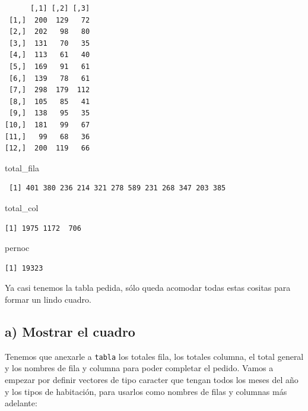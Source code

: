 \documentclass[
]{book}
\newenvironment{Shaded}{\begin{snugshade}}{\end{snugshade}}
\newcommand{\NormalTok}[1]{#1}
\begin{document}
\begin{verbatim}
      [,1] [,2] [,3]
 [1,]  200  129   72
 [2,]  202   98   80
 [3,]  131   70   35
 [4,]  113   61   40
 [5,]  169   91   61
 [6,]  139   78   61
 [7,]  298  179  112
 [8,]  105   85   41
 [9,]  138   95   35
[10,]  181   99   67
[11,]   99   68   36
[12,]  200  119   66
\end{verbatim}

\begin{Shaded}
\begin{Highlighting}[]
\NormalTok{total\_fila}
\end{Highlighting}
\end{Shaded}

\begin{verbatim}
 [1] 401 380 236 214 321 278 589 231 268 347 203 385
\end{verbatim}

\begin{Shaded}
\begin{Highlighting}[]
\NormalTok{total\_col}
\end{Highlighting}
\end{Shaded}

\begin{verbatim}
[1] 1975 1172  706
\end{verbatim}

\begin{Shaded}
\begin{Highlighting}[]
\NormalTok{pernoc}
\end{Highlighting}
\end{Shaded}

\begin{verbatim}
[1] 19323
\end{verbatim}

Ya casi tenemos la tabla pedida, sólo queda acomodar todas estas cositas para formar un lindo cuadro.

\hypertarget{a-mostrar-el-cuadro}{%
\subsection{a) Mostrar el cuadro}\label{a-mostrar-el-cuadro}}

Tenemos que anexarle a \texttt{tabla} los totales fila, los totales columna, el total general y los nombres de fila y columna para poder completar el pedido. Vamos a empezar por definir vectores de tipo caracter que tengan todos los meses del año y los tipos de habitación, para usarlos como nombres de filas y columnas más adelante:
\end{document}
